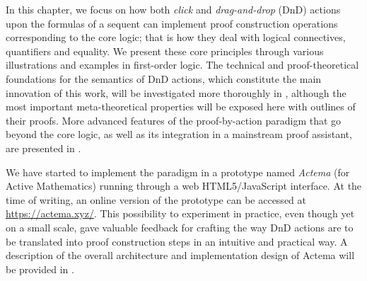


In this chapter, we focus on how both \emph{click} and \emph{drag-and-drop}
(DnD) actions upon the formulas of a sequent can implement proof construction
operations corresponding to the core logic; that is how they deal with logical
connectives, quantifiers and equality. We present these core principles through
various illustrations and examples in first-order logic. The technical and
proof-theoretical foundations for the semantics of DnD actions, which constitute
the main innovation of this work, will be investigated more thoroughly in
, although the most important meta-theoretical properties will be
exposed here with outlines of their proofs. More advanced features of the
proof-by-action paradigm that go beyond the core logic, as well as its
integration in a mainstream proof assistant, are presented in .

We have started to implement the paradigm in a prototype named {\em Actema} (for
Active Mathematics) running through a web HTML5/JavaScript interface. At the
time of writing, an online version of the prototype can be accessed at
\url{https://actema.xyz/}. This possibility to experiment in
practice, even though yet on a small scale, gave valuable feedback for crafting
the way DnD actions are to be translated into proof construction steps in an
intuitive and practical way. A description of the overall architecture and
implementation design of Actema will be provided in .

